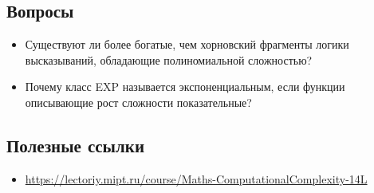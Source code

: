 \subsection{Вопросы}
\begin{itemize}
    \item Существуют ли более богатые, чем хорновский фрагменты логики высказываний, обладающие полиномиальной сложностью?
    \item Почему класс EXP называется экспоненциальным, если функции описывающие рост сложности показательные?
\end{itemize}

\subsection{Полезные ссылки}
\begin{itemize}
    \item \url{https://lectoriy.mipt.ru/course/Maths-ComputationalComplexity-14L}
\end{itemize}